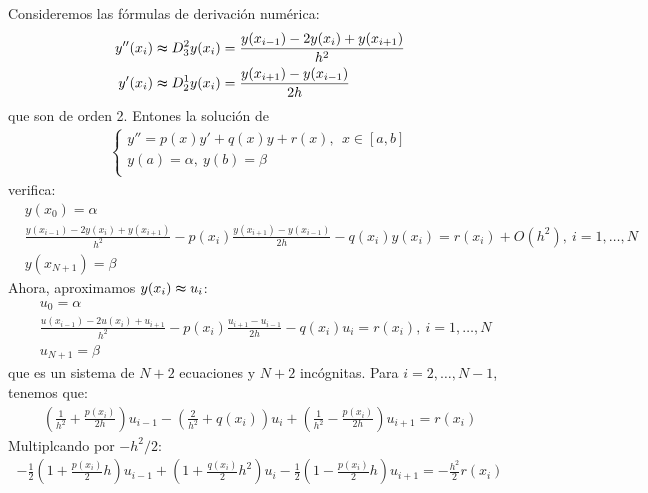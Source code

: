 \begin{ejemplo}
    Consideremos las fórmulas de derivación numérica:
    \begin{align*}
        y''(x_i) & \thickapprox D_3^2y(x_i) = \frac{y(x_{i-1}) - 2y(x_i) + y(x_{i+1})}{h^2} \\
        y'(x_i)  & \thickapprox D_2^1y(x_i) = \frac{y(x_{i+1}) - y(x_{i-1})}{2h}
    \end{align*}
    que son de orden 2. Entones la solución de
    \begin{align*}
        \left\{ \begin{array}{lcc}
                    y'' = p(x)y' + q(x)y + r(x), \ \ x \in [a,b] \\
                    y(a) = \alpha, \ y(b) = \beta                \\
                \end{array}
        \right.
    \end{align*}
    verifica:
    \begin{align*}
         & y(x_0) = \alpha                                                                                                                            \\
         & \frac{y(x_{i-1}) - 2y(x_i) + y(x_{i+1})}{h^2} - p(x_i)\frac{y(x_{i+1}) - y(x_{i-1})}{2h} -q(x_i)y(x_i) = r(x_i) + O(h^2), \ i = 1,\ldots,N \\
         & y(x_{N+1}) = \beta
    \end{align*}
    Ahora, aproximamos $y(x_i) \thickapprox u_i$:
    \begin{align*}
         & u_0 = \alpha                                                                                                          \\
         & \frac{u(x_{i-1}) - 2u(x_i) +u_{i+1}}{h^2} - p(x_i)\frac{u_{i+1} - u_{i-1}}{2h} -q(x_i)u_i = r(x_i) , \ i = 1,\ldots,N \\
         & u_{N+1} = \beta
    \end{align*}
    que es un sistema de $N+2$ ecuaciones y $N+2$ incógnitas. Para $i = 2,\ldots,N-1$, tenemos que:
    \begin{align*}
        \left( \frac{1}{h^2} + \frac{p(x_i)}{2h} \right) u_{i-1} - \left( \frac{2}{h^2} + q(x_i)\right)u_i + \left( \frac{1}{h^2} - \frac{p(x_i)}{2h} \right)u_{i+1} = r(x_i)
    \end{align*}
    Multiplcando por $-h^2/2$:
    \begin{align*}
        -\frac{1}{2}\left(1 + \frac{p(x_i)}{2}h \right)u_{i-1} + \left(1 + \frac{q(x_i)}{2}h^2 \right)u_{i} - \frac{1}{2}\left(1 - \frac{p(x_i)}{2}h \right)u_{i+1} = -\frac{h^2}{2}r(x_i)

\end{align*}
\end{ejemplo}
